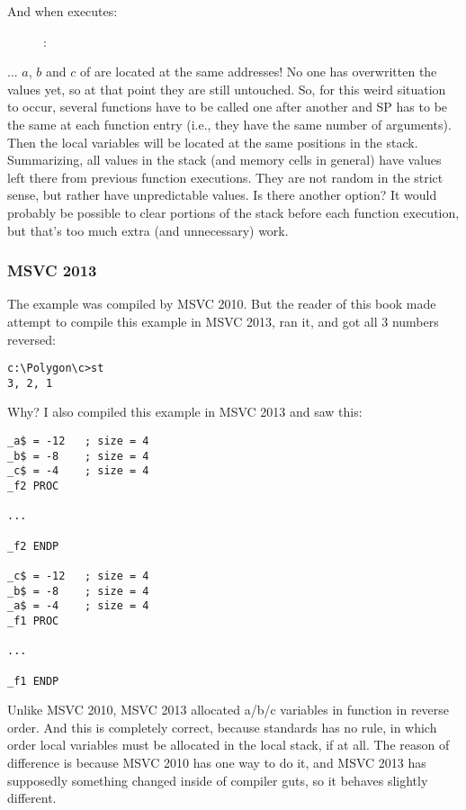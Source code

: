 \clearpage
And when  executes:

\begin{figure}[H]
\centering
{}
\caption{\olly: }
\label{fig:stack_noise_olly2}
\end{figure}

... $a$, $b$ and $c$ of  are located at the same addresses!
No one has overwritten the values yet, so at that point they are still untouched.
So, for this weird situation to occur, several functions have to be called one after another and
\ac{SP} has to be the same at each function entry (i.e., they have the same number
of arguments). Then the local variables will be located at the same positions in the stack.
Summarizing, all values in the stack (and memory cells in general) have values left there from previous function executions.
They are not random in the strict sense, but rather have unpredictable values.
Is there another option?
It would probably be possible to clear portions of the stack before each function execution,
but that's too much extra (and unnecessary) work.

\subsubsection{MSVC 2013}

The example was compiled by MSVC 2010.
But the reader of this book made attempt to compile this example in MSVC 2013, ran it, and got all 3 numbers reversed:%

\begin{lstlisting}
c:\Polygon\c>st
3, 2, 1
\end{lstlisting}

Why?
I also compiled this example in MSVC 2013 and saw this:


\begin{lstlisting}[caption=MSVC 2013,style=customasm]
_a$ = -12	; size = 4
_b$ = -8	; size = 4
_c$ = -4	; size = 4
_f2	PROC

...

_f2	ENDP

_c$ = -12	; size = 4
_b$ = -8	; size = 4
_a$ = -4	; size = 4
_f1	PROC

...

_f1	ENDP
\end{lstlisting}

Unlike MSVC 2010, MSVC 2013 allocated a/b/c variables in function  in reverse order.%
And this is completely correct, because \CCpp standards has no rule, in which order local variables must be allocated in the local stack, if at all.
The reason of difference is because MSVC 2010 has one way to do it, and MSVC 2013 has supposedly something changed inside of compiler guts, so it behaves slightly different.


